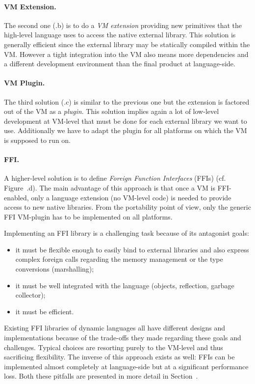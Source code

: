 \paragraph{VM Extension.}
The second one (.b) is to do a \emph{VM extension} providing new primitives that the high-level language uses to access the native external library.
This solution is generally efficient since the external library may be statically compiled within the VM.
However a tight integration into the VM also means more dependencies and a different development environment than the final product at language-side.

\paragraph{VM Plugin.}
The third solution (.c) is similar to the previous one but the extension is factored out of the VM as a \emph{plugin}.
This solution implies again a lot of low-level development at VM-level that must be done for each external library we want to use.
Additionally we have to adapt the plugin for all platforms on which the VM is supposed to run on.

\paragraph{FFI.}
A higher-level solution is to define \emph{Foreign Function Interfaces} (FFIs) (cf. Figure~.d).
The main advantage of this approach is that once a VM is FFI-enabled, only a language extension (no VM-level code) is needed to provide access to new native libraries.
From the portability point of view, only the generic FFI VM-plugin has to be implemented on all platforms.

Implementing an FFI library is a challenging task because of its antagonist goals:
\begin{itemize}
    \item it must be flexible enough to easily bind to external libraries and also express complex foreign calls regarding the memory management or the type conversions (marshalling);
    \item it must be well integrated with the language (objects, reflection, garbage collector);
    \item it must be efficient.
\end{itemize}
%
Existing FFI libraries of dynamic languages all have different designs and implementations because of the trade-offs they made regarding these goals and challenges.
Typical choices are resorting purely to the VM-level and thus sacrificing flexibility.
The inverse of this approach exists as well: FFIs can be implemented almost completely at language-side but at a significant performance loss.
Both these pitfalls are presented in more detail in Section~.


